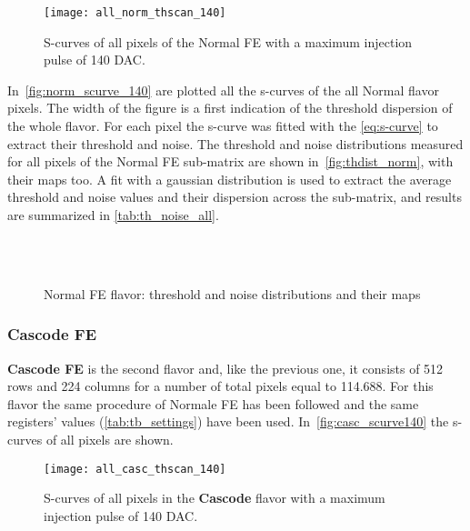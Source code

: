 \begin{figure}[h!]
\centering
\texttt{[image: all\_norm\_thscan\_140]}
\caption{S-curves of all pixels of the Normal FE with a maximum injection pulse of 140 DAC.}
\label{fig:norm_scurve_140}
\end{figure}


In~\autoref{fig:norm_scurve_140} are plotted all the s-curves of the all Normal flavor pixels. The width of the figure is a first indication of the threshold dispersion of the whole flavor.
For each pixel the s-curve was fitted with the \autoref{eq:s-curve} to extract their threshold and noise.  
The threshold and noise distributions measured for all pixels of the Normal FE sub-matrix are shown in~\autoref{fig:thdist_norm},  with their maps too. A fit with a gaussian distribution is used to extract the average threshold and noise values and their dispersion across the sub-matrix, and results are summarized in \autoref{tab:th_noise_all}.

\begin{figure}[h!]
\centering
{}\quad
{}\\
\quad
{}\\
\caption{Normal FE flavor: threshold and noise distributions and their maps}
\label{fig:thdist_norm}
\end{figure}



\subsubsection{Cascode FE}

\textbf{Cascode FE} is the second flavor and, like the previous one, it consists of 512 rows and 224 columns for a number of total pixels equal to 114.688. For this flavor the same procedure of Normale FE has been followed and the same registers' values (\autoref{tab:tb_settings}) have been used.
In~\autoref{fig:casc_scurve140} the s-curves of all pixels are shown.

\begin{figure}[h!]
\centering
\texttt{[image: all\_casc\_thscan\_140]}
\caption{S-curves of all pixels in the \textbf{Cascode} flavor with a maximum injection pulse of 140 DAC.}
\label{fig:casc_scurve140}
\end{figure}

